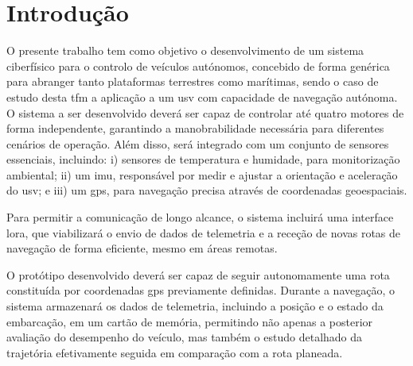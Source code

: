 


\chapter{Introdução}
\label{ch:introducao}

O presente trabalho tem como objetivo o desenvolvimento de um sistema ciberfísico para o controlo de veículos autónomos, concebido de forma genérica para abranger tanto plataformas terrestres como marítimas, sendo o caso de estudo desta \gls{tfm} a aplicação a um \gls{usv} com capacidade de navegação autónoma. O sistema a ser desenvolvido deverá ser capaz de controlar até quatro motores de forma independente, garantindo a manobrabilidade necessária para diferentes cenários de operação. Além disso, será integrado com um conjunto de sensores essenciais, incluindo: i) sensores de temperatura e humidade, para monitorização ambiental; ii) um \gls{imu}, responsável por medir e ajustar a orientação e aceleração do \gls{usv}; e iii) um \gls{gps}, para navegação precisa através de coordenadas geoespaciais.

Para permitir a comunicação de longo alcance, o sistema incluirá uma interface \gls{lora}, que viabilizará o envio de dados de telemetria e a receção de novas rotas de navegação de forma eficiente, mesmo em áreas remotas.

O protótipo desenvolvido deverá ser capaz de seguir autonomamente uma rota constituída por coordenadas \gls{gps} previamente definidas. Durante a navegação, o sistema armazenará os dados de telemetria, incluindo a posição e o estado da embarcação, em um cartão de memória, permitindo não apenas a posterior avaliação do desempenho do veículo, mas também o estudo detalhado da trajetória efetivamente seguida em comparação com a rota planeada.

